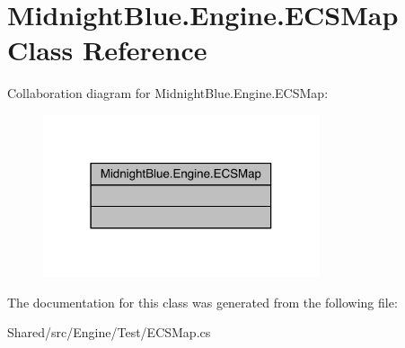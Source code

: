 \hypertarget{class_midnight_blue_1_1_engine_1_1_e_c_s_map}{}\section{Midnight\+Blue.\+Engine.\+E\+C\+S\+Map Class Reference}
\label{class_midnight_blue_1_1_engine_1_1_e_c_s_map}


Collaboration diagram for Midnight\+Blue.\+Engine.\+E\+C\+S\+Map\+:\nopagebreak
\begin{figure}[H]
\begin{center}
\leavevmode
\includegraphics[width=231pt]{class_midnight_blue_1_1_engine_1_1_e_c_s_map__coll__graph}
\end{center}
\end{figure}


The documentation for this class was generated from the following file\+:\begin{DoxyCompactItemize}
\item 
Shared/src/\+Engine/\+Test/E\+C\+S\+Map.\+cs\end{DoxyCompactItemize}
